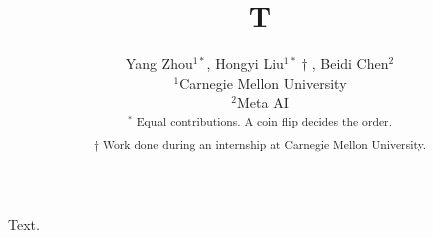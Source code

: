 \documentclass{article}
\title{T}
\author{Yang Zhou$^{1*}$, Hongyi Liu$^{1*}\dag$, Beidi Chen$^{2}$\\
$^1$Carnegie Mellon University\\
$^2$Meta AI\\
\textsuperscript{$^*$ Equal contributions. A coin flip decides the order.} \\
\textsuperscript{$\dag$ Work done during an internship at Carnegie Mellon University.}
}
\begin{document}
\maketitle
Text.
\end{document}

